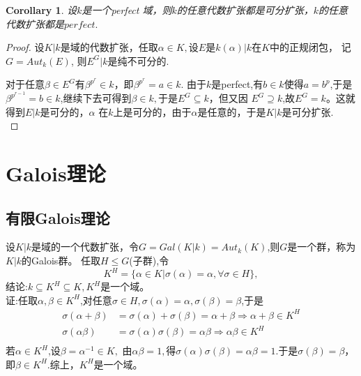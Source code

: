 \documentclass[UTF8]{article}
\newtheorem{cor}{Corollary}[section]
\begin{document}
\begin{cor}
设$k$是一个perfect 域，则$k$的任意代数扩张都是可分扩张，$k$的任意代数扩张都是$perfect.$
\end{cor}
\begin{proof}
	
	
	设$K|k$是域的代数扩张，任取$\alpha\in K,$设$E$是$k(\alpha)|k$在$K$中的正规闭包，
	记$G=Aut_{k}(E)$,
	则$E^{G}|k$是纯不可分的.
	
	
	对于任意$\beta\in E^{G}$有$\beta^{p^{r}}\in k$，即$\beta^{p^{r}}=a\in k$.
	由于$k$是perfect,有$b\in k$使得$a=b^{p}$,于是$\beta^{p^{r-1}}=b\in k$,继续下去可得到$\beta \in k,$于是$E^{G}\subseteq k$，但又因
	$E^{G}\supseteq k$,故$E^{G}=k$。这就得到$E|k$是可分的，$\alpha$
	在$k$上是可分的，由于$\alpha$是任意的，于是$K|k$是可分扩张.\\
	
\end{proof}

\section{Galois理论}
\subsection{有限Galois理论}
设$K|k$是域的一个代数扩张，令$G=Gal(K|k)=Aut_{k}(K)$,则$G$是一个群，称为$K|k$的Galois群。
任取$H\leq G$(子群),令
$$K^{H}=\{\alpha \in K|\sigma(\alpha)=\alpha,\forall \sigma \in H\},$$
结论:$k\subseteq K^{H}\subseteq K,K^{H}$是一个域。\\
证:任取$\alpha,\beta\in K^{H}$,对任意$\sigma \in H,\sigma(\alpha)=\alpha,\sigma(\beta)=\beta$,于是
\[
\begin{split}
\sigma(\alpha+\beta)&=\sigma(\alpha)+\sigma(\beta)=\alpha+\beta\Longrightarrow \alpha+\beta\in K^{H} \\
\sigma(\alpha\beta)&=\sigma(\alpha)\sigma(\beta)=\alpha\beta\Longrightarrow \alpha\beta \in K^{H}\\
\end{split}
\]
若$\alpha\in K^{H}$,设$\beta=\alpha^{-1}\in K,$
由$\alpha\beta=1,$得$\sigma(\alpha)\sigma(\beta)=\alpha\beta=1$.于是$\sigma(\beta)=\beta$，即$\beta\in K^{H}.$综上，$K^{H}$是一个域。\\
\end{document}
